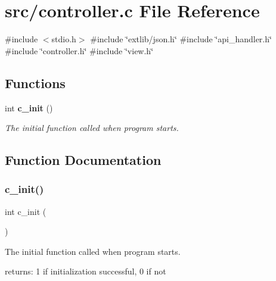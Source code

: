 \section{src/controller.c File Reference}
\label{controller_8c}
{\ttfamily \#include $<$stdio.\+h$>$}\newline
{\ttfamily \#include \char`\"{}extlib/json.\+h\char`\"{}}\newline
{\ttfamily \#include \char`\"{}api\+\_\+handler.\+h\char`\"{}}\newline
{\ttfamily \#include \char`\"{}controller.\+h\char`\"{}}\newline
{\ttfamily \#include \char`\"{}view.\+h\char`\"{}}\newline
\subsection*{Functions}
\begin{DoxyCompactItemize}
\item 
int \textbf{ c\+\_\+init} ()
\begin{DoxyCompactList}\small\item\em The initial function called when program starts. \end{DoxyCompactList}\end{DoxyCompactItemize}


\subsection{Function Documentation}
\mbox{\label{controller_8c_a05510c73d1644e21429ac9ed43fb91be}} 
\subsubsection{c\+\_\+init()}
{\footnotesize\ttfamily int c\+\_\+init (\begin{DoxyParamCaption}{ }\end{DoxyParamCaption})}



The initial function called when program starts. 

returns\+: 1 if initialization successful, 0 if not 